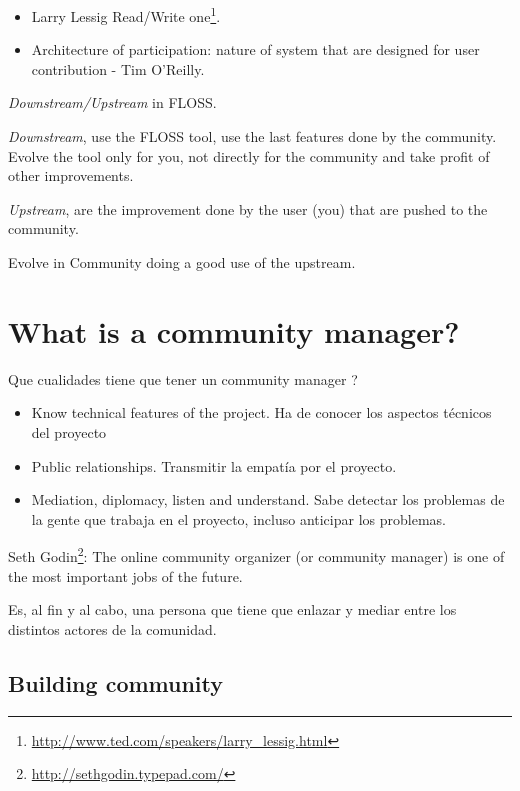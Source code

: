 \documentclass[11pt]{scrartcl}
\begin{document}
\begin{itemize}
	\item Larry Lessig Read/Write one\footnote{\url{http://www.ted.com/speakers/larry_lessig.html}}.
	\item Architecture of participation: nature of system that are designed for user contribution - Tim O'Reilly.
\end{itemize}

\par \emph{Downstream/Upstream} in FLOSS.

\par \emph{Downstream}, use the FLOSS tool, use the last features done by the community. Evolve the tool only for you, not directly for the community and take profit of other improvements.

\par \emph{Upstream}, are the improvement done by the user (you) that are pushed to the community.

\par Evolve in Community doing a good use of the upstream.

\section{What is a community manager?}
\label{sec:what-is}

\par Que cualidades tiene que tener un community manager ?
\begin{itemize}
	\item Know technical features of the project. Ha de conocer los aspectos técnicos del proyecto
	\item Public relationships. Transmitir la empatía por el proyecto.
	\item Mediation, diplomacy, listen and understand. Sabe detectar los problemas de la gente que trabaja en el proyecto, incluso anticipar los problemas.
\end{itemize}

\par Seth Godin\footnote{\url{http://sethgodin.typepad.com/}}: The online community organizer (or community manager) is one of the most important jobs of the future.

\par Es, al fin y al cabo, una persona que tiene que enlazar y mediar entre los distintos actores de la comunidad.

\subsection{Building community}
\label{sec:build-com}
\end{document}
